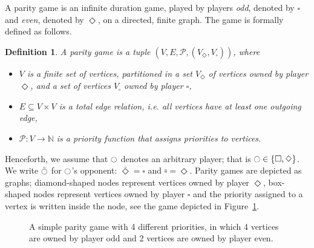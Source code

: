 \documentclass{eptcs}
\newtheorem{defi}{Definition}
\newenvironment{definition}{\begin{defi} \rm }{\end{defi}}
\def\nat{\mathbb{N}}
\renewcommand{\i}{\ensuremath{\ocircle}\xspace}
\newcommand{\odd}{\ensuremath{\square}\xspace}
\newcommand{\even}{\ensuremath{\Diamond}\xspace}
\newcommand{\pnot}[1]{\bar{#1}}
\newcommand{\ie}{\emph{i.e.}\xspace}
\newcommand{\oftype}{{:}}
\newcommand{\priosym}{\mathcal{P}}
\begin{document}
A parity game is an infinite duration game, played by players \emph{odd},
denoted by $\odd$ and \emph{even}, denoted by $\even$, on a directed,
finite graph. The game is formally defined as follows.

\begin{definition}
A parity game is a tuple $(V, E, \priosym, (V_\even,V_\odd))$, where
\begin{itemize}
\item $V$ is a finite set of vertices, partitioned in a set $V_\even$ of
vertices owned by player $\even$, and a set of vertices $V_\odd$ 
owned by player $\odd$,
\item $E \subseteq V \times V$ is a total edge relation, \ie all vertices
have at least one outgoing edge,
\item $\priosym \oftype V \to \nat$ is a priority function that assigns
priorities to vertices.
\end{itemize}
\end{definition}
Henceforth, we assume that $\i$ denotes an arbitrary
player; that is $\i \in \{\odd,\even\}$. We write $\pnot{\i}$ for
$\i$'s opponent:  $\pnot{\even}=\odd$ and $\pnot{\odd}=\even$.
Parity games are depicted as graphs; diamond-shaped nodes
represent vertices owned by player $\even$, box-shaped nodes
represent vertices owned by player $\odd$ and the priority assigned
to a vertex is written inside the node, see the game depicted in
Figure~\ref{fig:example}.
\begin{figure}[h!]
\centering
{}
\caption{A simple parity game with 4 different priorities, in which 4 vertices are 
owned by player odd and 2 vertices are owned by player even.}
\label{fig:example}
\end{figure}
\end{document}
